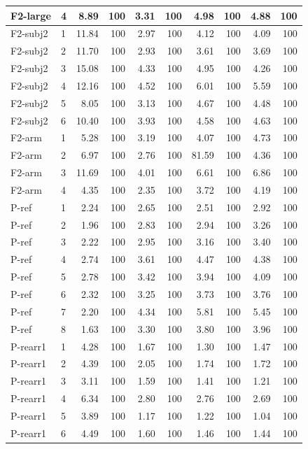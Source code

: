 \begin{longtable}{llrrrrrrrr}
F2-large & 4 & 8.89 & 100 & 3.31 & 100 & 4.98 & 100 & 4.88 & 100\\
\midrule
F2-subj2 & 1 & 11.84 & 100 & 2.97 & 100 & 4.12 & 100 & 4.09 & 100\\
F2-subj2 & 2 & 11.70 & 100 & 2.93 & 100 & 3.61 & 100 & 3.69 & 100\\
F2-subj2 & 3 & 15.08 & 100 & 4.33 & 100 & 4.95 & 100 & 4.26 & 100\\
F2-subj2 & 4 & 12.16 & 100 & 4.52 & 100 & 6.01 & 100 & 5.59 & 100\\
F2-subj2 & 5 & 8.05 & 100 & 3.13 & 100 & 4.67 & 100 & 4.48 & 100\\
F2-subj2 & 6 & 10.40 & 100 & 3.93 & 100 & 4.58 & 100 & 4.63 & 100\\
\midrule
F2-arm & 1 & 5.28 & 100 & 3.19 & 100 & 4.07 & 100 & 4.73 & 100\\
F2-arm & 2 & 6.97 & 100 & 2.76 & 100 & 81.59 & 100 & 4.36 & 100\\
F2-arm & 3 & 11.69 & 100 & 4.01 & 100 & 6.61 & 100 & 6.86 & 100\\
F2-arm & 4 & 4.35 & 100 & 2.35 & 100 & 3.72 & 100 & 4.19 & 100\\
\midrule
P-ref & 1 & 2.24 & 100 & 2.65 & 100 & 2.51 & 100 & 2.92 & 100\\
P-ref & 2 & 1.96 & 100 & 2.83 & 100 & 2.94 & 100 & 3.26 & 100\\
P-ref & 3 & 2.22 & 100 & 2.95 & 100 & 3.16 & 100 & 3.40 & 100\\
P-ref & 4 & 2.74 & 100 & 3.61 & 100 & 4.47 & 100 & 4.38 & 100\\
P-ref & 5 & 2.78 & 100 & 3.42 & 100 & 3.94 & 100 & 4.09 & 100\\
P-ref & 6 & 2.32 & 100 & 3.25 & 100 & 3.73 & 100 & 3.76 & 100\\
P-ref & 7 & 2.20 & 100 & 4.34 & 100 & 5.81 & 100 & 5.45 & 100\\
P-ref & 8 & 1.63 & 100 & 3.30 & 100 & 3.80 & 100 & 3.96 & 100\\
\midrule
P-rearr1 & 1 & 4.28 & 100 & 1.67 & 100 & 1.30 & 100 & 1.47 & 100\\
P-rearr1 & 2 & 4.39 & 100 & 2.05 & 100 & 1.74 & 100 & 1.72 & 100\\
P-rearr1 & 3 & 3.11 & 100 & 1.59 & 100 & 1.41 & 100 & 1.21 & 100\\
P-rearr1 & 4 & 6.34 & 100 & 2.80 & 100 & 2.76 & 100 & 2.69 & 100\\
P-rearr1 & 5 & 3.89 & 100 & 1.17 & 100 & 1.22 & 100 & 1.04 & 100\\
P-rearr1 & 6 & 4.49 & 100 & 1.60 & 100 & 1.46 & 100 & 1.44 & 100\\

\end{longtable}

